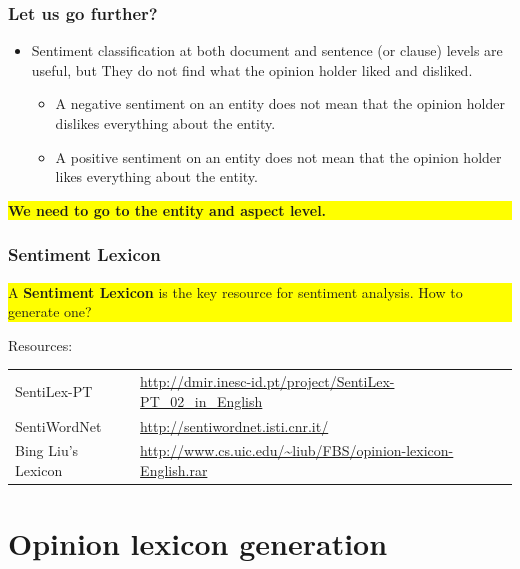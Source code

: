 \documentclass[t]{beamer}
\begin{document}
\begin{frame} \frametitle{Let us go further?} %

\begin{itemize}
\item Sentiment classification at both document and sentence (or clause) levels are useful, but 
They do not find what the opinion holder liked and disliked.
  \begin{itemize}
    \item A negative sentiment on an entity does not mean that the opinion holder dislikes everything about the entity.
    \item A positive sentiment on an entity does not mean that the opinion holder likes everything about the entity.
  \end{itemize}
\end{itemize}

\colorbox{yellow}{\parbox{0.9 \textwidth} {\textbf{We need to go to the entity and aspect level.}}}

\end{frame}


\begin{frame} \frametitle{Sentiment Lexicon}

\colorbox{yellow}{\parbox{0.9 \textwidth} {A {\bf Sentiment Lexicon}
    is the key resource for sentiment analysis. How to generate one?}}

\vfill
Resources:
\begin{tabular}{l l}
SentiLex-PT & \url{http://dmir.inesc-id.pt/project/SentiLex-PT_02_in_English}\\
SentiWordNet & \url{ http://sentiwordnet.isti.cnr.it/} \\
Bing Liu's Lexicon & \url{http://www.cs.uic.edu/~liub/FBS/opinion-lexicon-English.rar}

\end{tabular}
\end{frame}



\section{Opinion lexicon generation}
\end{document}
